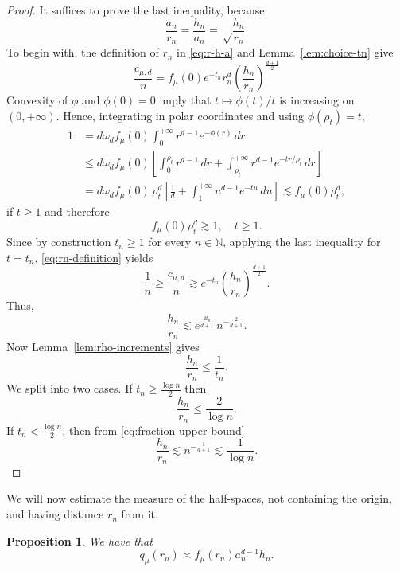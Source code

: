 \documentclass[10pt]{amsart}
\newcommand{\1}{\textbf{1}}
\numberwithin{equation}{section} %
\newtheorem{proposition}[theorem]{Proposition}
\theoremstyle{remark}
\theoremstyle{definition}
\begin{document}
\begin{proof}
    It suffices to prove the last inequality, because \[\frac{a_n}{r_n}=\frac{h_n}{a_n}=\sqrt\frac{h_n}{r_n}.\]
    To begin with, the definition of $r_n$ in \eqref{eq:r-h-a} and Lemma~\ref{lem:choice-tn} give \begin{equation}\label{eq:rn-definition}
        \frac{c_{\mu,d}}{n}=f_\mu(0)e^{-t_n}r_n^{d}\left(\frac{h_n}{r_n}\right)^{\frac{d+1}{2}}
    \end{equation}
    Convexity of $\phi$ and $\phi(0)=0$ imply that $t \mapsto \phi(t)/t$ is increasing on $(0,+\infty)$. Hence, integrating in polar coordinates and using $\phi(\rho_t)=t$, 
    \begin{align*}
        1&=d\omega_df_\mu(0)\int_{0}^{+\infty} r^{d-1} e^{-\phi(r)}
        \, dr \\
        &\leq d\omega_df_\mu(0) \left[\int_{0}^{\rho_t}r^{d-1} \,dr+\int_{\rho_t}^{+\infty}r^{d-1}e^{-tr/\rho_t}\, dr\right]\\
        &=d\omega_df_\mu(0)\,\rho_t^d\left[\frac{1}{d} +\int_{1}^{+\infty} u^{d-1}e^{-tu} \, du \right] \lesssim f_\mu(0)\rho_t^d,
    \end{align*} if $t \geq 1$ and therefore \[f_\mu(0)\rho_t^d \gtrsim 1, \quad t \geq 1.\] Since by construction $t_n \geq 1$ for every $n \in \mathbb{N}$, applying the last inequality for $t=t_n$, \eqref{eq:rn-definition} yields \[\frac{1}{n}\geq \frac{c_{\mu,d}}{n} \gtrsim e^{-t_n}\left(\frac{h_n}{r_n}\right)^{\frac{d+1}{2}}. \] Thus, \begin{equation}\label{eq:fraction-upper-bound}
    \frac{h_n}{r_n} \lesssim e^{\frac{2t_n}{d+1}}\,n^{-\frac{2}{d+1}}.\end{equation} Now Lemma~\ref{lem:rho-increments} gives \[\frac{h_n}{r_n}\leq \frac{1}{t_n}.\] We split into two cases. If $t_n\geq \frac{\log n}{2}$ then \[\frac{h_n}{r_n} \leq \frac{2}{\log n}.\] If $t_n<\frac{\log n}{2}$, then from \eqref{eq:fraction-upper-bound} \[\frac{h_n}{r_n} \lesssim n^{-\frac{1}{d+1}} \lesssim \frac{1}{\log n}.\]
\end{proof}


We will now estimate the measure of the half-spaces, not containing the origin, and having distance $r_n$ from it.

\begin{proposition}\label{prop:q-shell-comparison}
We have that
\[
q_\mu(r_n)\asymp f_\mu(r_n)a_n^{d-1}h_n.
\]
\end{proposition}
\end{document}
